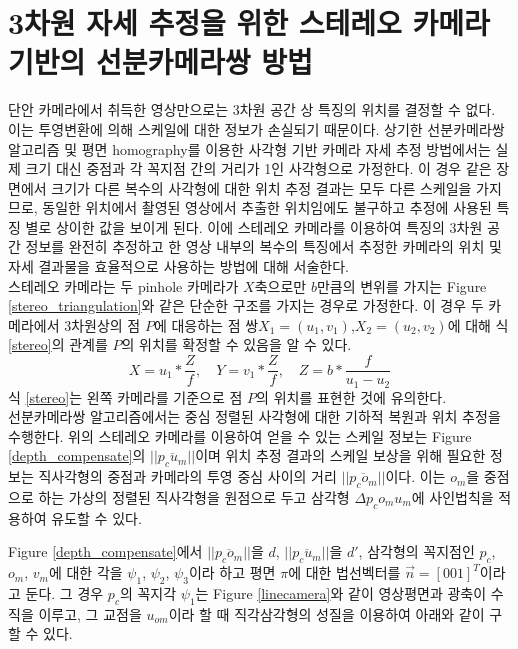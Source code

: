 \documentclass[master,korean,final]{cbnu-ecs}
\begin{document}
\newpage

\section{3차원 자세 추정을 위한 스테레오 카메라 기반의 선분카메라쌍 방법}
단안 카메라에서 취득한 영상만으로는 3차원 공간 상 특징의 위치를 결정할 수 없다. 이는 투영변환에 의해 스케일에 대한 정보가 손실되기 때문이다. 상기한 선분카메라쌍 알고리즘 및 평면 homography를 이용한 사각형 기반 카메라 자세 추정 방법에서는 실제 크기 대신 중점과 각 꼭지점 간의 거리가 1인 사각형으로 가정한다. 이 경우 같은 장면에서 크기가 다른 복수의 사각형에 대한 위치 추정 결과는 모두 다른 스케일을 가지므로, 동일한 위치에서 촬영된 영상에서 추출한 위치임에도 불구하고 추정에 사용된 특징 별로 상이한 값을 보이게 된다. 이에 스테레오 카메라를 이용하여 특징의 3차원 공간 정보를 완전히 추정하고 한 영상 내부의 복수의 특징에서 추정한 카메라의 위치 및 자세 결과물을 효율적으로 사용하는 방법에 대해 서술한다. \\
스테레오 카메라는 두 pinhole 카메라가 $X$축으로만 $b$만큼의 변위를 가지는 Figure \ref{stereo_triangulation}와 같은 단순한 구조를 가지는 경우로 가정한다. 이 경우 두 카메라에서 3차원상의 점 $P$에 대응하는 점 쌍$X_1=(u_1,v_1)$,$X_2=(u_2,v_2)$에 대해 식 \eqref{stereo}의 관계를 $P$의 위치를 확정할 수 있음을 알 수 있다.
\begin{equation}
\label{stereo}
X=u_1*\frac{Z}{f}, \quad Y=v_1*\frac{Z}{f}, \quad Z=b*\frac{f}{u_1-u_2}
\end{equation}
식 \eqref{stereo}는 왼쪽 카메라를 기준으로 점 $P$의 위치를 표현한 것에 유의한다.\\
선분카메라쌍 알고리즘에서는 중심 정렬된 사각형에 대한 기하적 복원과 위치 추정을 수행한다. 위의 스테레오 카메라를 이용하여 얻을 수 있는 스케일 정보는 Figure \ref{depth_compensate}의 $||\overline{p_c u_m}||$이며 위치 추정 결과의 스케일 보상을 위해 필요한 정보는 직사각형의 중점과 카메라의 투영 중심 사이의 거리 $||\overline{p_c o_m}||$이다. 이는 $o_m$을 중점으로 하는 가상의 정렬된 직사각형을 원점으로 두고 삼각형 $\Delta p_c o_m u_m$에 사인법칙을 적용하여 유도할 수 있다.

Figure \ref{depth_compensate}에서 $||\overline{p_c o_m}||$을 $d$, $||\overline{p_c u_m}||$을 $d'$, 삼각형의 꼭지점인 $p_c$, $o_m$, $v_m$에 대한 각을 $\psi_1$, $\psi_2$, $\psi_3$이라 하고 평면 $\pi$에 대한 법선벡터를 $\overrightarrow{n} = [0 0 1]^T$이라고 둔다. 그 경우 $p_c$의 꼭지각 $\psi_1$는 Figure \ref{linecamera}와 같이 영상평면과 광축이 수직을 이루고, 그 교점을 $u_{om}$이라 할 때 직각삼각형의 성질을 이용하여 아래와 같이 구할 수 있다.
\end{document}
